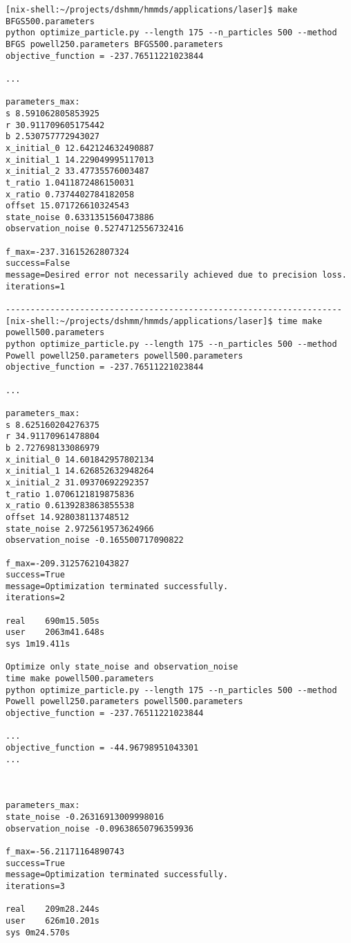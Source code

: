 \documentclass[12pt]{article}
\begin{document}
\begin{verbatim}
[nix-shell:~/projects/dshmm/hmmds/applications/laser]$ make BFGS500.parameters 
python optimize_particle.py --length 175 --n_particles 500 --method BFGS powell250.parameters BFGS500.parameters
objective_function = -237.76511221023844

...

parameters_max:
s 8.591062805853925
r 30.911709605175442
b 2.530757772943027
x_initial_0 12.642124632490887
x_initial_1 14.229049995117013
x_initial_2 33.47735576003487
t_ratio 1.0411872486150031
x_ratio 0.7374402784182058
offset 15.071726610324543
state_noise 0.6331351560473886
observation_noise 0.5274712556732416

f_max=-237.31615262807324
success=False
message=Desired error not necessarily achieved due to precision loss.
iterations=1

--------------------------------------------------------------------
[nix-shell:~/projects/dshmm/hmmds/applications/laser]$ time make powell500.parameters 
python optimize_particle.py --length 175 --n_particles 500 --method Powell powell250.parameters powell500.parameters
objective_function = -237.76511221023844

...

parameters_max:
s 8.625160204276375
r 34.91170961478804
b 2.727698133086979
x_initial_0 14.601842957802134
x_initial_1 14.626852632948264
x_initial_2 31.09370692292357
t_ratio 1.0706121819875836
x_ratio 0.6139283863855538
offset 14.928038113748512
state_noise 2.9725619573624966
observation_noise -0.165500717090822

f_max=-209.31257621043827
success=True
message=Optimization terminated successfully.
iterations=2

real	690m15.505s
user	2063m41.648s
sys	1m19.411s

Optimize only state_noise and observation_noise
time make powell500.parameters 
python optimize_particle.py --length 175 --n_particles 500 --method Powell powell250.parameters powell500.parameters
objective_function = -237.76511221023844

...
objective_function = -44.96798951043301
...



parameters_max:
state_noise -0.26316913009998016
observation_noise -0.09638650796359936

f_max=-56.21171164890743
success=True
message=Optimization terminated successfully.
iterations=3

real	209m28.244s
user	626m10.201s
sys	0m24.570s

\end{verbatim}
\end{document}
